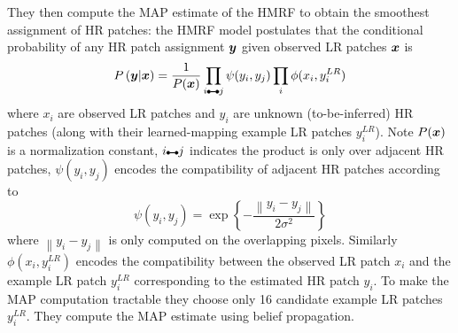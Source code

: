 %
They then compute the MAP estimate of the HMRF to obtain the smoothest assignment of HR patches: the HMRF model postulates that the conditional probability of any HR patch assignment $\bm{y}$ given observed LR patches $\bm{x}$ is
\begin{equation}
	P\left( \by \middle| \bx \right) = \frac{1}{P(\bx)} \prod_{i\ue{} j} \psi(y_i, y_j) \prod_i \phi(x_i, y_i^{LR})
\end{equation}
where $x_i$ are observed LR patches and $y_i$ are unknown (to-be-inferred) HR patches (along with their learned-mapping example LR patches $y_i^{LR}$).
%
Note $P(\bm{x})$ is a normalization constant, $i\ue{} j$ indicates the product is only over adjacent HR patches, $\psi(y_i, y_j)$ encodes the compatibility of adjacent HR patches according to
\begin{equation}
	\psi(y_i, y_j) = \exp \left\{ -  \frac{\left\| y_i - y_j \right\|}{2\sigma^2} \right\}
\end{equation}
where $\left\| y_i - y_j \right\|$ is only computed on the overlapping pixels.
%
Similarly $\phi(x_i, y_i^{LR})$ encodes the compatibility between the observed LR patch $x_i$ and the example LR patch $y_i^{LR}$ corresponding to the estimated HR patch $y_i$.
%
To make the MAP computation tractable they choose only 16 candidate example LR patches $y_i^{LR}$.
%
They compute the MAP estimate using belief propagation.
